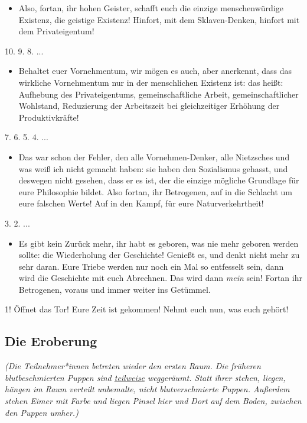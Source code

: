 \documentclass[a4paper, 12pt]{report}
\begin{document}
\begin{itemize}\em
\item[] Also, fortan, ihr hohen Geister, schafft euch die einzige menschenwürdige Existenz, die geistige Existenz!
    Hinfort, mit dem Sklaven-Denken, hinfort mit dem Privateigentum! 
\end{itemize}

10. 9. 8. ...

\begin{itemize}\em
\item[] Behaltet euer Vornehmentum, wir mögen es auch, aber anerkennt, dass das wirkliche Vornehmentum nur in der menschlichen Existenz ist:
    das heißt: Aufhebung des Privateigentums, gemeinschaftliche Arbeit, gemeinschaftlicher Wohlstand, Reduzierung der Arbeitszeit bei gleichzeitiger Erhöhung der Produktivkräfte!
\end{itemize}

7. 6. 5. 4. ...

\begin{itemize}\em
\item[] Das war schon der Fehler, den alle Vornehmen-Denker, alle Nietzsches und was weiß ich nicht gemacht haben: sie haben den Sozialismus gehasst, und deswegen nicht gesehen, dass er es ist, der die einzige mögliche Grundlage für eure Philosophie bildet.
    Also fortan, ihr Betrogenen, auf in die Schlacht um eure falschen Werte!
    Auf in den Kampf, für eure Naturverkehrtheit!
\end{itemize}

3. 2. ...

\begin{itemize}\em
\item[] Es gibt kein Zurück mehr, ihr habt es geboren, was nie mehr geboren werden sollte: die Wiederholung der Geschichte!
    Genießt es, und denkt nicht mehr zu sehr daran.
    Eure Triebe werden nur noch ein Mal so entfesselt sein, dann wird die Geschichte mit euch Abrechnen. 
    Das wird dann \emph{mein}  sein!
    Fortan ihr Betrogenen, voraus und immer weiter ins Getümmel.
\end{itemize}

1! 
Öffnet das Tor! 
Eure Zeit ist gekommen! 
Nehmt euch nun, was euch gehört!


\subsection{Die Eroberung}
\textit{(Die Teilnehmer*innen betreten wieder den ersten Raum. 
Die früheren blutbeschmierten Puppen sind \hyperref[zahl_der_puppen]{teilweise} weggeräumt.
Statt ihrer stehen, liegen, hängen im Raum verteilt unbemalte, nicht blutverschmierte Puppen.
Außerdem stehen Eimer mit Farbe und liegen Pinsel hier und Dort auf dem Boden, zwischen den Puppen umher.)}\\
\end{document}
